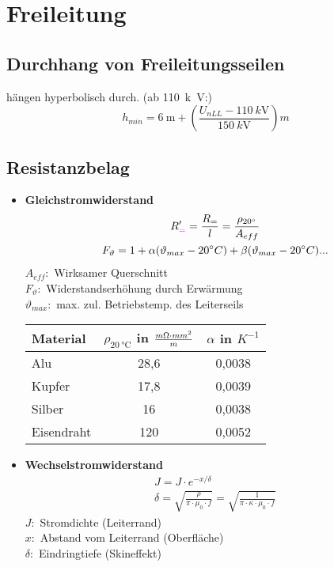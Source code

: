 \section{Freileitung}
\subsection{Durchhang von Freileitungsseilen}
hängen hyperbolisch durch. (ab \SI{110}{k\volt}:)
\begin{equation*}
    h_{min} = \SI{6}{\metre} + \left(\frac{U_{\mathit{nLL}} - \SI{110}{k\volt}}{\SI{150}{k\volt}}\right)m
\end{equation*}
\subsection{Resistanzbelag}
\begin{itemize}
\item[]{\textbf{Gleichstromwiderstand}}
\begin{gather*}
    R_{\textcolor{purple}{=}}' = \frac{R_{=}}{l} = \frac{\rho_{20 \degree}}{A_{eff}}\\
    F_{\vartheta} = 1 + \alpha (\vartheta_{max} - 20\degree C) + \beta (\vartheta_{max} - 20\degree C)...
\end{gather*}
$A_{eff}:$ Wirksamer Querschnitt\\
$F_{\vartheta}:$ Widerstandserhöhung durch Erwärmung\\
$\vartheta_{max}:$ max. zul. Betriebstemp. des Leiterseils\\

\begin{table}[h]
\centering
\begin{tabular}[h]{|l|c|c|}
    \hline
    Material & $\rho_{\SI{20}{\degreeCelsius}}$ in $\frac{m\ohm \cdot mm^2}{m}$ & $\alpha$ in $K^{-1}$ \\
    \hline
    Alu & 28,6 & 0,0038 \\
    \hline
    Kupfer & 17,8 & 0,0039 \\
    \hline
    Silber & 16 & 0,0038 \\
    \hline
    Eisendraht & 120 & 0,0052 \\
    \hline
\end{tabular}
\end{table}

\item[]{\textbf{Wechselstromwiderstand}}
\begin{gather*}
    J = J \cdot e^{-x/\delta}\\
    \delta = \sqrt{ \frac{\rho}{\pi \cdot \mu_{0} \cdot f}}
     = \sqrt{ \frac{1}{\pi \cdot \kappa \cdot \mu_{0} \cdot f}}
\end{gather*}
$J:$ Stromdichte (Leiterrand)\\
$x:$ Abstand vom Leiterrand (Oberfläche)\\
$\delta:$ Eindringtiefe (Skineffekt)\\


\end{itemize}
